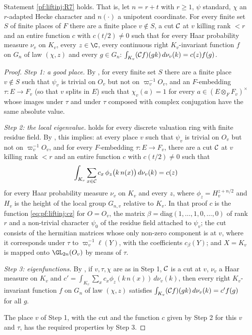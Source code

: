 \begin{proposition}\label{pf:liftinj:jpos}
Statement \ref{pf:liftinj:R7} holds. That is, let $n=r+t$ with $r\ge1$, $\psi$ standard, $\chi$ an $r$-adapted Hecke character and $n(\cdot)$ a
unipotent coordinate. For every finite set $S$ of finite places of $F$ there are a finite place $v\notin S$, a cut $\mathcal{C}$ at $v$ killing
rank $<r$ and an entire function $c$ with $c(t/2)\ne0$ such that for every Haar probability measure $\nu_v$ on $K_v$, every $z\in\C$, every
continuous right $K_v$-invariant function $f$ on $G_n$ of law $(\chi,z)$ and every $g\in G_n$:
$\int_{K_v}(\mathcal{C} f)(gk)\,d\nu_v(k)=c(z)f(g)$.
\end{proposition}

\begin{proof}
\emph{Step 1: a good place.} By , for every finite set $S$ there are a finite place
$v\notin S$ such that $\psi_v$ is trivial on $O_v$ but not on $\varpi_v^{-1}O_v$, and an $F$-embedding $\tau:E\to F_v$ (so that $v$ splits in $E$)
such that $\chi_v(a)=1$ for every $a\in(E\otimes_FF_v)^\times$ whose images under $\tau$ and under $\tau$ composed with complex conjugation have the
same absolute value.

\emph{Step 2: the local eigenvalue.}  holds for every discrete valuation ring with finite residue field. By
, this implies: at every place $v$ such that $\psi_v$ is trivial on $O_v$ but not on
$\varpi_v^{-1}O_v$, and for every $F$-embedding $\tau:E\to F_v$, there are a cut $\mathcal{C}$ at $v$ killing rank $<r$ and an entire function $c$ with
$c(t/2)\ne0$ such that
\[
\int_{K_v}\sum_{x\in\mathcal{C}}c_x\,\phi_z\bigl(k\,n(x)\bigr)\,d\nu_v(k)=c(z)
\]
for every Haar probability measure $\nu_v$ on $K_v$ and every $z$, where $\phi_z=H_v^{z+n/2}$ and $H_v$ is the height of the local group
$G_{n,v}$ relative to $K_v$. In that proof $c$ is the function \eqref{eq:pf:liftinj:cz} for $O=O_v$, the matrix
$\beta=\mathrm{diag}(1,\dots,1,0,\dots,0)$ of rank $r$ and a non-trivial character $\psi_0$ of the residue field attached to $\psi_v$; the cut consists
of the hermitian matrices whose only non-zero component is at $v$, where it corresponds under $\tau$ to $\varpi_v^{-1}\ell(Y)$, with the
coefficients $c_\beta(Y)$; and $X=K_v$ is mapped onto $\GL_{2n}(O_v)$ by means of $\tau$.

\emph{Step 3: eigenfunctions.} By , if $v,\tau,\chi$ are as in Step 1, $\mathcal{C}$
is a cut at $v$, $\nu_v$ a Haar measure on $K_v$ and $c'=\int_{K_v}\sum_{x}c_x\phi_z(k\,n(x))\,d\nu_v(k)$, then every right $K_v$-invariant
function $f$ on $G_n$ of law $(\chi,z)$ satisfies $\int_{K_v}(\mathcal{C} f)(gk)\,d\nu_v(k)=c'f(g)$ for all $g$.

The place $v$ of Step 1, with the cut and the function $c$ given by Step 2 for this $v$ and $\tau$, has the required properties by Step 3.
\end{proof}

